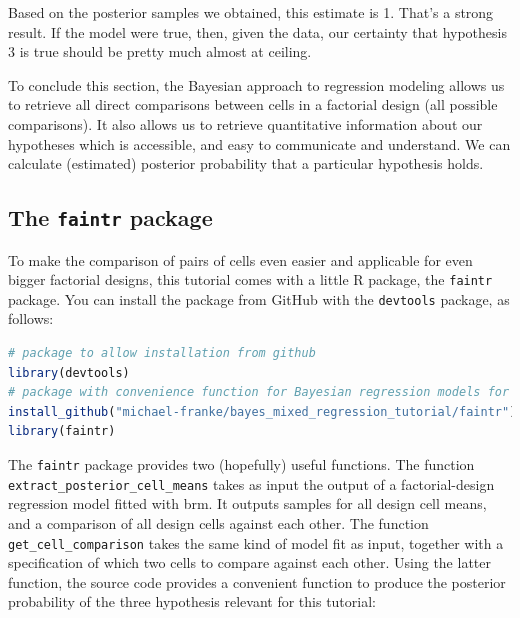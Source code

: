 \documentclass[nobib]{tufte-handout}
\begin{document}
Based on the posterior samples we obtained, this estimate is 1. That's a strong result. If the model were true, then, given the data, our certainty that hypothesis 3 is true should be pretty much almost at ceiling.

To conclude this section, the Bayesian approach to regression modeling allows us to retrieve all direct comparisons between cells in a factorial design (all possible comparisons). It also allows us to retrieve quantitative information about our hypotheses which is accessible, and easy to communicate and understand. We can calculate (estimated) posterior probability that a particular hypothesis holds. %

\subsection{The \texttt{faintr} package}

To make the comparison of pairs of cells even easier and applicable for even bigger factorial designs, this tutorial comes with a little R package, the \texttt{faintr} package.
%
%
You can install the package from GitHub with the \texttt{devtools} package, as follows:

\begin{minipage}[]{1\textwidth}
\begin{lstlisting}[language=R]
# package to allow installation from github
library(devtools)
# package with convenience function for Bayesian regression models for factorial designs
install_github("michael-franke/bayes_mixed_regression_tutorial/faintr") # install from GitHub
library(faintr)
\end{lstlisting}
\end{minipage}

The \texttt{faintr} package provides two (hopefully) useful functions. The function \texttt{extract\_posterior\_cell\_means} takes as input the output of a factorial-design regression model fitted with \textrm{brm}. It outputs samples for all design cell means, and a comparison of all design cells against each other. The function \texttt{get\_cell\_comparison} takes the same kind of model fit as input, together with a specification of which two cells to compare against each other. Using the latter function, the source code provides a convenient function to produce the posterior probability of the three hypothesis relevant for this tutorial:
%
\end{document}
